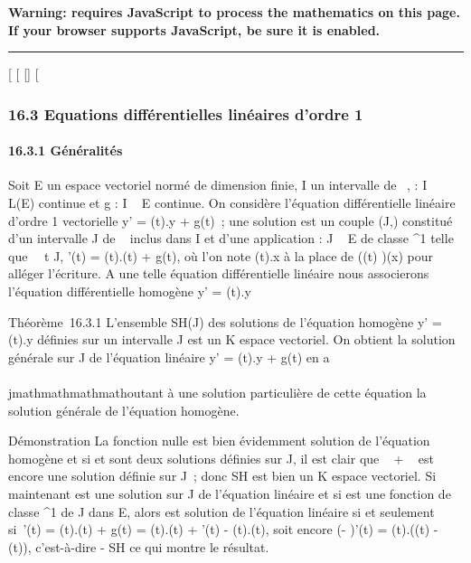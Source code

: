 \textbf{Warning: 
requires JavaScript to process the mathematics on this page.\\ If your
browser supports JavaScript, be sure it is enabled.}

\begin{center}\rule{3in}{0.4pt}\end{center}

{[}
{[}
{[}{]}
{[}

\subsubsection{16.3 Equations différentielles linéaires d'ordre 1}

\paragraph{16.3.1 Généralités}

Soit E un espace vectoriel normé de dimension finie, I un intervalle de
~, \ell : I \rightarrow~ L(E) continue et g : I \rightarrow~ E continue. On considère l'équation
différentielle linéaire d'ordre 1 vectorielle y' = \ell(t).y + g(t)~; une
solution est un couple (J,\phi) constitué d'un intervalle J de ~ inclus
dans I et d'une application \phi : J \rightarrow~ E de classe ^1 telle que
\forall~~t \in J, \phi'(t) = \ell(t).\phi(t) + g(t), où l'on note
\ell(t).x à la place de \left (\ell(t)\right
)(x) pour alléger l'écriture. A une telle équation différentielle
linéaire nous associerons l'équation différentielle homogène y' = \ell(t).y

Théorème~16.3.1 L'ensemble SH(J) des solutions de l'équation
homogène y' = \ell(t).y définies sur un intervalle J est un K espace
vectoriel. On obtient la solution générale sur J de l'équation linéaire
y' = \ell(t).y + g(t) en a\\\\jmathmathmathmathoutant à une solution particulière de cette
équation la solution générale de l'équation homogène.

Démonstration La fonction nulle est bien évidemment solution de
l'équation homogène et si  et  sont deux
solutions définies sur J, il est clair que \alpha~ + \beta~
est encore une solution définie sur J~; donc SH est bien un K
espace vectoriel. Si maintenant  est une solution sur J de
l'équation linéaire et si \phi est une fonction de classe ^1 de
J dans E, alors \phi est solution de l'équation linéaire si et seulement
si~\phi'(t) = \ell(t).\phi(t) + g(t) = \ell(t).\phi(t) + '(t) -
\ell(t).(t), soit encore (\phi - )'(t) = \ell(t).(\phi(t) -
(t)), c'est-à-dire \phi -  \in SH ce qui
montre le résultat.

